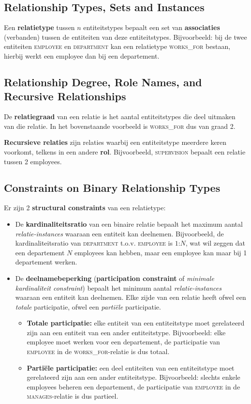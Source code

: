 \subsection{Relationship Types, Sets and Instances}
Een \textbf{relatietype} tussen $n$ entiteitstypes bepaalt een set van \textbf{associaties} (verbanden) tussen de entiteiten van deze entiteitstypes. Bijvoorbeeld: bij de twee entiteiten \textsc{employee} en \textsc{department} kan een relatietype \textsc{works\_for} bestaan, hierbij werkt een employee dan bij een departement.

\subsection{Relationship Degree, Role Names, and Recursive Relationships}
De \textbf{relatiegraad} van een relatie is het aantal entiteitstypes die deel uitmaken van die relatie. In het bovenstaande voorbeeld is \textsc{works\_for} dus van graad 2.

\textbf{Recursieve relaties} zijn relaties waarbij een entiteitstype meerdere keren voorkomt, telkens in een andere \textbf{rol}. Bijvoorbeeld, \textsc{supervision} bepaalt een relatie tussen 2 employees.

\subsection{Constraints on Binary Relationship Types}
Er zijn 2 \textbf{structural constraints} van een relatietype:
\begin{itemize}
\item De \textbf{kardinaliteitsratio} van een binaire relatie bepaalt het maximum aantal \textit{relatie-instances} waaraan een entiteit kan deelnemen. Bijvoorbeeld, de kardinaliteitsratio van \textsc{department} t.o.v. \textsc{employee} is $1$:$N$, wat wil zeggen dat een departement $N$ employees kan hebben, maar een employee kan maar bij 1 departement werken.

\item De \textbf{deelnamebeperking} (\textbf{participation constraint} of \textit{minimale kardinaliteit constraint}) bepaalt het minimum aantal \textit{relatie-instances} waaraan een entiteit kan deelnemen. Elke zijde van een relatie heeft ofwel een \textit{totale} participatie, ofwel een \textit{parti\"ele} participatie.
\begin{itemize}
\item \textbf{Totale participatie:} elke entiteit van een entiteitstype moet gerelateerd zijn aan een entiteit van een ander entiteitstype. Bijvoorbeeld: elke employee moet werken voor een departement, de participatie van \textsc{employee} in de \textsc{works\_for}-relatie is dus totaal.
\item \textbf{Parti\"ele participatie:} een deel entiteiten van een entiteitstype moet gerelateerd zijn aan een ander entiteitstype. Bijvoorbeeld: slechts enkele employees beheren een departement, de participatie van \textsc{employee} in de \textsc{manages}-relatie is dus partieel.
\end{itemize}
\end{itemize}

